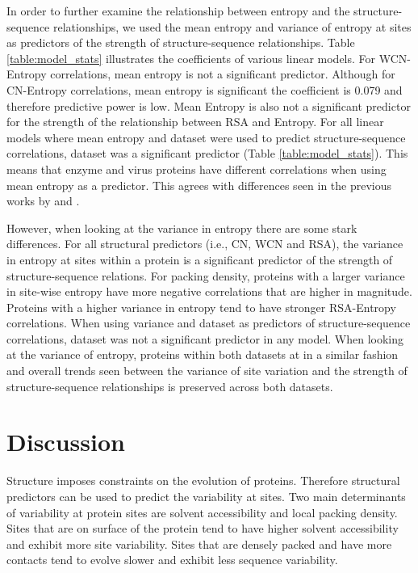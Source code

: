 \documentclass[12pt]{article}
\begin{document}
\indent In order to further examine the relationship between entropy and the structure-sequence relationships, we used the mean entropy and variance of entropy at sites as predictors of the strength of structure-sequence relationships. Table \ref{table:model_stats} illustrates the coefficients of various linear models.  For WCN-Entropy correlations, mean entropy is not a significant predictor. Although for CN-Entropy correlations, mean entropy is significant the coefficient is 0.079 and therefore predictive power is low. Mean Entropy is also not a significant predictor for the strength of the relationship between RSA and Entropy. For all linear models where mean entropy and dataset were used to predict structure-sequence correlations, dataset was a significant predictor (Table \ref{table:model_stats}). This means that enzyme and virus proteins have different correlations when using mean entropy as a predictor. This agrees with differences seen in the previous works by \cite{Yehetal2014} and \cite{Shahmoradietal2014}.  

\indent However, when looking at the variance in entropy there are some stark differences. For all structural predictors (i.e., CN, WCN and RSA), the variance in entropy at sites within a protein is a significant predictor of the strength of structure-sequence relations. For packing density, proteins with a larger variance in site-wise entropy have more negative correlations that are higher in magnitude. Proteins with a higher variance in entropy tend to have stronger RSA-Entropy correlations. When using variance and dataset as predictors of structure-sequence correlations, dataset was not a significant predictor in any model. When looking at the variance of entropy, proteins within both datasets at in a similar fashion and overall trends seen between the variance of site variation and the strength of structure-sequence relationships is preserved across both datasets. 

\section{Discussion}
\label{sec:dcr}
Structure imposes constraints on the evolution of proteins. Therefore structural predictors can be used to predict the variability at sites. Two main determinants of variability at protein sites are solvent accessibility and local packing density. Sites that are on surface of the protein tend to have higher solvent accessibility and exhibit more site variability. Sites that are densely packed and have more contacts tend to evolve slower and exhibit less sequence variability. 
\end{document}
